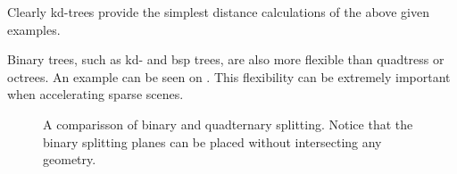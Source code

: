 Clearly kd-trees provide the simplest distance calculations of the
above given examples.


Binary trees, such as kd- and bsp trees, are also more flexible than
quadtress or octrees. An example can be seen on
. This flexibility can be extremely important
when accelerating sparse scenes.

\begin{figure}
  \centering
  \hspace{20pt}

  \parbox{9cm}{\caption[Comparisson of binary and quadternary
      splitting]{A comparisson of binary and quadternary
      splitting. Notice that the binary splitting planes can be placed
      without intersecting any geometry.}\label{fig:binQuadSplit}}
\end{figure}


